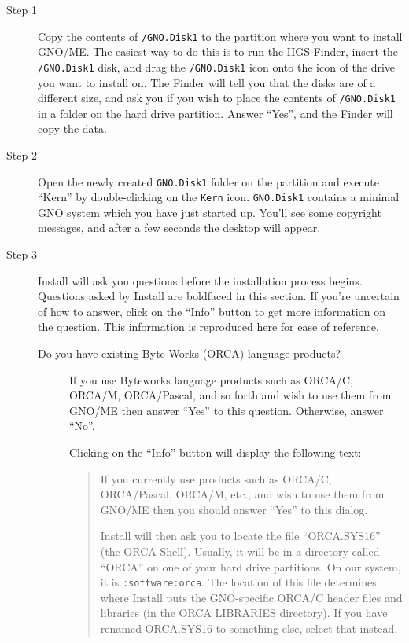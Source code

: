 \documentclass{report}
\begin{document}
\begin{description}
\item[Step 1]

Copy the contents of \texttt{/GNO.Disk1} to the partition where you want
to install GNO/ME. The easiest way to do this is to run the IIGS
Finder, insert the \texttt{/GNO.Disk1} disk, and drag the 
\texttt{/GNO.Disk1} icon onto the icon of the drive you want to install on.
The Finder will tell you that the disks are of a different size, and
ask you if you wish to place the contents of \texttt{/GNO.Disk1}
in a folder on the hard drive partition.
Answer ``Yes'', and the Finder will copy the data.

\item[Step 2]

Open the newly created \texttt{GNO.Disk1} folder on the partition
and execute ``Kern'' by double-clicking on the \texttt{Kern} icon.
\texttt{GNO.Disk1} contains a minimal GNO system which you have
just started up. You'll see some copyright messages, and after a few
seconds the desktop will appear.

\item[Step 3]

Install will ask you questions before the installation process begins.
Questions asked by Install are boldfaced in this section.
If you're uncertain of how to answer, click on the ``Info'' button
to get more information on the question. This information is
reproduced here for ease of reference.

\begin{description}

\item[Do you have existing Byte Works (ORCA) language products?]

If you use Byteworks language products such as ORCA/C, ORCA/M,
ORCA/Pascal, and so forth and wish to use them from GNO/ME then
answer ``Yes'' to this question. Otherwise, answer ``No''.

Clicking on the ``Info'' button will display the following text:

	\begin{quote}

	If you currently use products such as ORCA/C, ORCA/Pascal,
	ORCA/M, etc., and wish to use them from GNO/ME then you should
	answer ``Yes'' to this dialog.
        

	Install will then ask you to locate the file ``ORCA.SYS16'' (the
	ORCA Shell). Usually, it will be in a directory called ``ORCA'' on
	one of your hard drive partitions. On our system, it is
	\texttt{:software:orca}.
	The location of this file determines where Install puts the
	GNO-specific ORCA/C header files and libraries (in the ORCA
	LIBRARIES directory).  If you have renamed ORCA.SYS16 to
	something else, select that instead. 


\end{quote}
\end{description}
\end{description}
\end{document}
